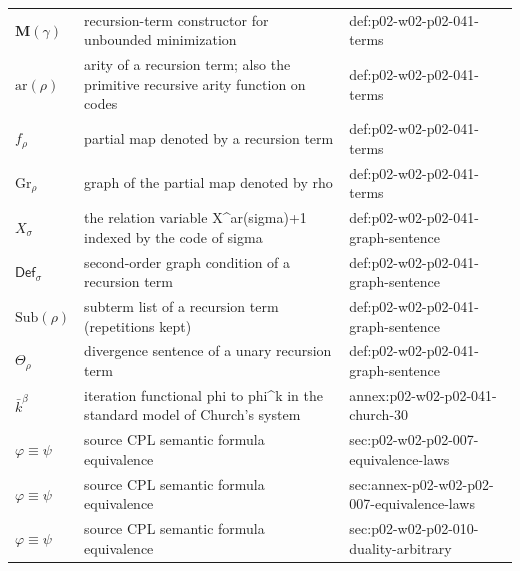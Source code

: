 \begin{longtable}{@{}p{}p{}p{}@{}}
\(\mathbf M(\gamma)\) & recursion-term constructor for unbounded minimization & def:\allowbreak{}p02-\allowbreak{}w02-\allowbreak{}p02-\allowbreak{}041-\allowbreak{}terms \\
\(\mathrm{ar}(\rho)\) & arity of a recursion term; also the primitive recursive arity function on codes & def:\allowbreak{}p02-\allowbreak{}w02-\allowbreak{}p02-\allowbreak{}041-\allowbreak{}terms \\
\(f_\rho\) & partial map denoted by a recursion term & def:\allowbreak{}p02-\allowbreak{}w02-\allowbreak{}p02-\allowbreak{}041-\allowbreak{}terms \\
\(\mathrm{Gr}_\rho\) & graph of the partial map denoted by rho & def:\allowbreak{}p02-\allowbreak{}w02-\allowbreak{}p02-\allowbreak{}041-\allowbreak{}terms \\
\(X_\sigma\) & the relation variable X\^{}{ar(sigma)+1} indexed by the code of sigma & def:\allowbreak{}p02-\allowbreak{}w02-\allowbreak{}p02-\allowbreak{}041-\allowbreak{}graph-\allowbreak{}sentence \\
\(\mathsf{Def}_\sigma\) & second-order graph condition of a recursion term & def:\allowbreak{}p02-\allowbreak{}w02-\allowbreak{}p02-\allowbreak{}041-\allowbreak{}graph-\allowbreak{}sentence \\
\(\mathrm{Sub}(\rho)\) & subterm list of a recursion term (repetitions kept) & def:\allowbreak{}p02-\allowbreak{}w02-\allowbreak{}p02-\allowbreak{}041-\allowbreak{}graph-\allowbreak{}sentence \\
\(\Theta_\rho\) & divergence sentence of a unary recursion term & def:\allowbreak{}p02-\allowbreak{}w02-\allowbreak{}p02-\allowbreak{}041-\allowbreak{}graph-\allowbreak{}sentence \\
\(\bar k^{\beta}\) & iteration functional phi to phi\^{}k in the standard model of Church's system & annex:\allowbreak{}p02-\allowbreak{}w02-\allowbreak{}p02-\allowbreak{}041-\allowbreak{}church-\allowbreak{}30 \\
\(\varphi\equiv\psi\) & source CPL semantic formula equivalence & sec:\allowbreak{}p02-\allowbreak{}w02-\allowbreak{}p02-\allowbreak{}007-\allowbreak{}equivalence-\allowbreak{}laws \\
\(\varphi\equiv\psi\) & source CPL semantic formula equivalence & sec:\allowbreak{}annex-\allowbreak{}p02-\allowbreak{}w02-\allowbreak{}p02-\allowbreak{}007-\allowbreak{}equivalence-\allowbreak{}laws \\
\(\varphi\equiv\psi\) & source CPL semantic formula equivalence & sec:\allowbreak{}p02-\allowbreak{}w02-\allowbreak{}p02-\allowbreak{}010-\allowbreak{}duality-\allowbreak{}arbitrary \\

\end{longtable}
